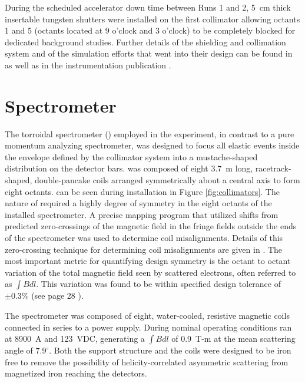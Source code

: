 During the scheduled accelerator down time between Runs 1 and 2, 5~cm thick insertable tungsten shutters were installed on the first collimator allowing octants 1 and 5 (octants located at 9 o'clock and 3 o'clock) to be completely blocked for dedicated background studies.  Further details of the shielding and collimation system and of the simulation efforts that went into their design can be found in \cite{Myers} as well as in the \Qs instrumentation publication \cite{QweakNIM}.

\section{\qtor Spectrometer}
The torroidal spectrometer (\qtor) employed in the \Qs experiment, in contrast to a pure momentum analyzing spectrometer, was designed to focus all elastic events inside the envelope defined by the collimator system into a mustache-shaped distribution on the detector bars. \qtor was composed of eight 3.7~m long, racetrack-shaped, double-pancake coils arranged symmetrically about a central axis to form eight octants. \qtor can be seen during installation in Figure \ref{fig:collimators}. The nature of \Qs required a highly degree of symmetry in the eight octants of the installed spectrometer. A precise mapping program that utilized shifts from predicted zero-crossings of the magnetic field in the fringe fields outside the ends of the spectrometer was used to determine coil misalignments. Details of this zero-crossing technique for determining coil misalignments are given in \cite{Wang}. The most important metric for quantifying design symmetry is the octant to octant variation of the total magnetic field seen by scattered electrons, often referred to as $\int B dl$. This variation was found to be within specified design tolerance of $\pm0.3\%$ (see page 28 \cite{QweakNIM}).

The \qtor spectrometer was composed of eight, water-cooled, resistive magnetic coils connected in series to a power supply. During nominal operating conditions \qtor ran at 8900~A and 123~VDC, generating a $\int B dl$ of 0.9~T-m at the mean scattering angle of $7.9^{\circ}$. Both the \qtor support structure and the coils were designed to be iron free to remove the possibility of helicity-correlated asymmetric scattering from magnetized iron reaching the detectors.

